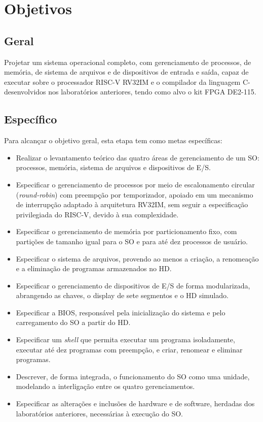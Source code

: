 \documentclass[
	12pt,				%
	openright,			%
	a4paper,			%
	english,			%
	french,				%
	spanish,			%
	brazilian,				%
	]{abntex2}
\begin{document}
\chapter{Objetivos}
\section{Geral}
Projetar um sistema operacional completo, com gerenciamento de processos, de memória,
de sistema de arquivos e de dispositivos de entrada e saída, capaz de executar sobre o
processador RISC-V RV32IM e o compilador da linguagem C- desenvolvidos nos laboratórios
anteriores, tendo como alvo o kit FPGA DE2-115.
 
\section{Específico}
Para alcançar o objetivo geral, esta etapa tem como metas específicas:
\begin{itemize}
  \item Realizar o levantamento teórico das quatro áreas de gerenciamento de um SO:
        processos, memória, sistema de arquivos e dispositivos de E/S.
  \item Especificar o gerenciamento de processos por meio de escalonamento circular
        (\emph{round-robin}) com preempção por temporizador, apoiado em um mecanismo
        de interrupção adaptado à arquitetura RV32IM, sem seguir a especificação
        privilegiada do RISC-V, devido à sua complexidade.
  \item Especificar o gerenciamento de memória por particionamento fixo, com
        partições de tamanho igual para o SO e para até dez processos de usuário.
  \item Especificar o sistema de arquivos, provendo ao menos a criação, a renomeação
        e a eliminação de programas armazenados no HD.
  \item Especificar o gerenciamento de dispositivos de E/S de forma modularizada,
        abrangendo as chaves, o display de sete segmentos e o HD simulado.
  \item Especificar a BIOS, responsável pela inicialização do sistema e pelo
        carregamento do SO a partir do HD.
  \item Especificar um \emph{shell} que permita executar um programa isoladamente,
        executar até dez programas com preempção, e criar, renomear e eliminar
        programas.
  \item Descrever, de forma integrada, o funcionamento do SO como uma unidade,
        modelando a interligação entre os quatro gerenciamentos.
  \item Especificar as alterações e inclusões de hardware e de software, herdadas dos
        laboratórios anteriores, necessárias à execução do SO.
\end{itemize}
 
\end{document}
